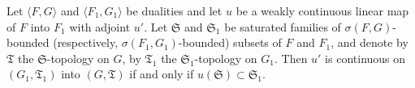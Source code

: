 Let $\langle F, G \rangle$ and $\langle F_1, G_1 \rangle$ be dualities and let $u$ be a weakly continuous linear map of $F$ into $F_1$ with adjoint $u'$. Let $\mathfrak{S}$ and $\mathfrak{S}_1$ be saturated families of $\sigma(F, G)$-bounded (respectively, $\sigma(F_1, G_1)$-bounded) subsets of $F$ and $F_1$, and denote by $\mathfrak{T}$ the $\mathfrak{S}$-topology on $G$, by $\mathfrak{T}_1$ the $\mathfrak{S}_1$-topology on $G_1$. Then $u'$ is continuous on $(G_1, \mathfrak{T}_1)$ into $(G, \mathfrak{T})$ if and only if $u(\mathfrak{S}) \subset \mathfrak{S}_1$.

